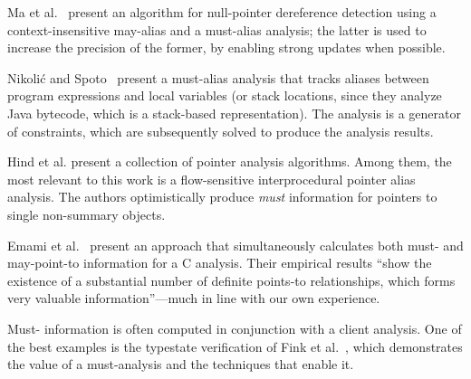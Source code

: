 Ma et al.~\cite{isola:2008:Ma} present an algorithm for
null-pointer dereference detection using a context-insensitive
may-alias and a must-alias analysis; the latter is used to increase
the precision of the former, by enabling strong updates when possible.

Nikoli\'{c} and Spoto~\cite{ictac:2012:Nikolic} present a
must-alias analysis that tracks aliases between program expressions
and local variables (or stack locations, since they analyze Java
bytecode, which is a stack-based representation).  The analysis is a
generator of constraints, which are subsequently solved to produce the
analysis results.

Hind et al. \cite{article:1999:Hind} present a collection of pointer
analysis algorithms. Among them, the most relevant to this work is a
flow-sensitive interprocedural pointer alias analysis. The authors
optimistically produce \emph{must} information for pointers to single
non-summary objects.

Emami et al.~\cite{pldi:1994:Emami} present an approach that
simultaneously calculates both must- and may-point-to information for
a C analysis. Their empirical results ``show the existence of a
substantial number of definite points-to relationships, which forms
very valuable information''---much in line with our own
experience.

Must- information is often computed in conjunction with a
client analysis. One of the best examples is the typestate
verification of Fink et al.~\cite{issta:2006:Fink}, which demonstrates the value of
a must-analysis and the techniques that enable it.



